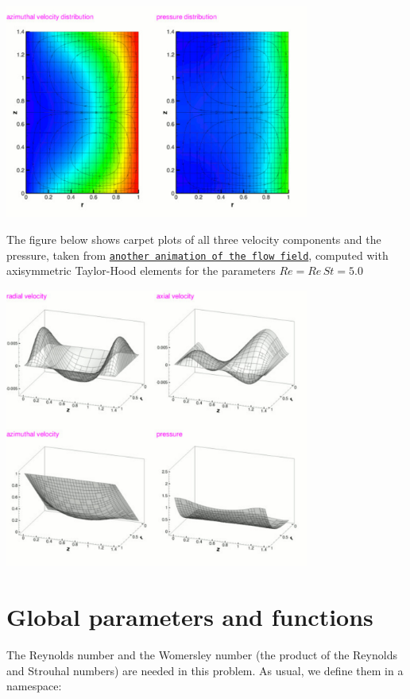  
\begin{DoxyImage}
\includegraphics[width=0.75\textwidth]{spin_up_stream}
\end{DoxyImage}


The figure below shows carpet plots of all three velocity components and the pressure, taken from \href{../figures/spin_up_carpet.avi}{\tt another animation of the flow field}, computed with axisymmetric Taylor-\/\+Hood elements for the parameters $ Re = Re \, St = 5.0 $

 
\begin{DoxyImage}
\includegraphics[width=0.75\textwidth]{spin_up_carpet}
\end{DoxyImage}




 

\hypertarget{index_namespace}{}\section{Global parameters and functions}\label{index_namespace}
The Reynolds number and the Womersley number (the product of the Reynolds and Strouhal numbers) are needed in this problem. As usual, we define them in a namespace\+:

